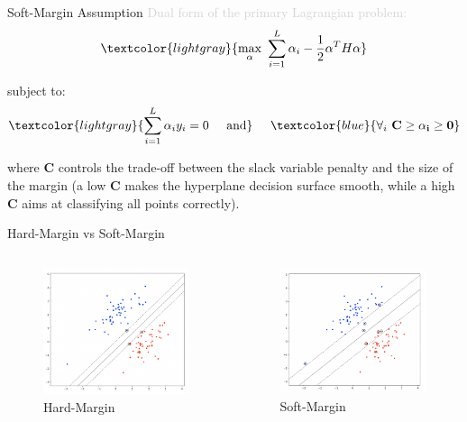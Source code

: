 \begin{frame}[fragile]{Soft-Margin Assumption}
  \textcolor{lightgray}{Dual form of the primary Lagrangian problem:}
  \newline
  \begin{equation*}
    \begin{split}
      \textcolor{lightgray}{\max_{\alpha}\ \sum_{i=1}^{L} \alpha_i - \frac{1}{2} \alpha^T H \alpha}
    \end{split}
  \end{equation*}

  subject to:
  \newline
  \begin{equation*}
    \textcolor{lightgray}{\sum_{i=1}^{L} \alpha_i y_i = 0 \hspace{.5cm} \text{and}}
    \hspace{.5cm} 
    \textcolor{blue}{\forall_i\ \mathbf{C \geq \alpha_i \geq 0}}
  \end{equation*}

  \vspace{.3cm}

  where $\mathbf{C}$ controls the trade-off between the slack variable penalty 
  and the size of the margin (a low $\mathbf{C}$ makes the hyperplane decision 
  surface smooth, while a high $\mathbf{C}$ aims at classifying all points correctly).
\end{frame}

\begin{frame}[fragile]{Hard-Margin vs Soft-Margin}
  \begin{columns}[onlytextwidth, T, c]
    \begin{column}{.5\textwidth}
        \begin{figure}
            \includegraphics[width=5cm]{assets/images/s3.01.png}
            \caption{Hard-Margin}
        \end{figure}
    \end{column}
    \begin{column}{.5\textwidth}
        \begin{figure}
            \includegraphics[width=5cm]{assets/images/s3.02.png}
            \caption{Soft-Margin}
        \end{figure}
    \end{column}    
  \end{columns}
\end{frame}
